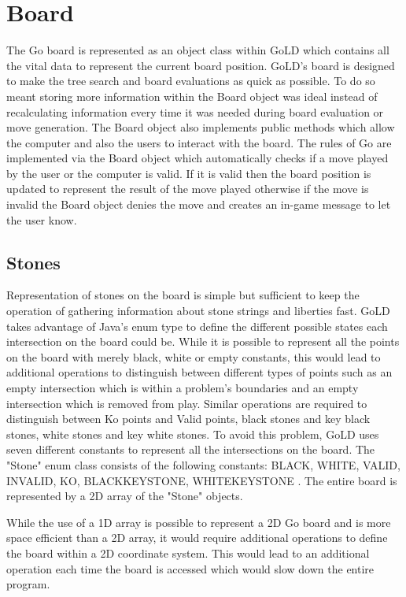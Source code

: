 \documentclass{l4proj}
\begin{document}
\section{Board}

The Go board is represented as an object class within GoLD which contains all the vital data to represent the current board position. GoLD's board is designed to make the tree search and board evaluations as quick as possible. To do so meant storing more information within the Board object was ideal instead of recalculating information every time it was needed during board evaluation or move generation. The Board object also implements public methods which allow the computer and also the users to interact with the board. The rules of Go are implemented via the Board object which automatically checks if a move played by the user or the computer is valid. If it is valid then the board position is updated to represent the result of the move played otherwise if the move is invalid the Board object denies the move and creates an in-game message to let the user know.

\subsection{Stones}
Representation of stones on the board is simple but sufficient to keep the operation of gathering information about stone strings and liberties fast. GoLD takes advantage of Java’s enum type to define the different possible states each intersection on the board could be. While it is possible to represent all the points on the board with merely black, white or empty constants, this would lead to additional operations to distinguish between different types of points such as an empty intersection which is within a problem’s boundaries and an empty intersection which is removed from play. Similar operations are required to distinguish between Ko points and Valid points, black stones and key black stones, white stones and key white stones. To avoid this problem, GoLD uses seven different constants to represent all the intersections on the board. The "Stone" enum class consists of the following constants: BLACK, WHITE, VALID, INVALID, KO, BLACKKEYSTONE, WHITEKEYSTONE . The entire board is represented by a 2D array of the "Stone" objects.

While the use of a 1D array is possible to represent a 2D Go board and is more space efficient than a 2D array, it would require additional operations to define the board within a 2D coordinate system. This would lead to an additional operation each time the board is accessed which would slow down the entire program.
\end{document}
